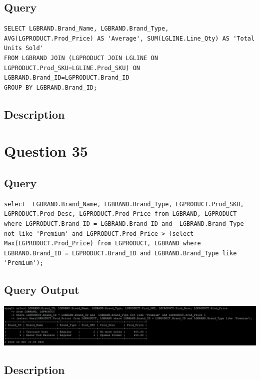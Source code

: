 \documentclass[a4paper,10pt]{article}
\begin{document}
 \subsection{Query}
          \lstset{
            language=SQL,
            breaklines=true
            }
        \begin{lstlisting}[frame=single]
        SELECT LGBRAND.Brand_Name, LGBRAND.Brand_Type, AVG(LGPRODUCT.Prod_Price) AS 'Average', SUM(LGLINE.Line_Qty) AS 'Total Units Sold'
FROM LGBRAND JOIN (LGPRODUCT JOIN LGLINE ON LGPRODUCT.Prod_SKU=LGLINE.Prod_SKU) ON LGBRAND.Brand_ID=LGPRODUCT.Brand_ID
GROUP BY LGBRAND.Brand_ID;

        \end{lstlisting}
\subsection{Description}
\section*{Question 35}
 \subsection{Query}
          \lstset{
            language=SQL,
            breaklines=true
            }
        \begin{lstlisting}[frame=single]
        select  LGBRAND.Brand_Name, LGBRAND.Brand_Type, LGPRODUCT.Prod_SKU, LGPRODUCT.Prod_Desc, LGPRODUCT.Prod_Price from LGBRAND, LGPRODUCT where LGPRODUCT.Brand_ID = LGBRAND.Brand_ID and  LGBRAND.Brand_Type not like 'Premium' and LGPRODUCT.Prod_Price > (select Max(LGPRODUCT.Prod_Price) from LGPRODUCT, LGBRAND where LGBRAND.Brand_ID = LGPRODUCT.Brand_ID and LGBRAND.Brand_Type like 'Premium');

        \end{lstlisting}
\subsection{Query Output}
           \includegraphics{Queries/Question_35/Question35.PNG}
\subsection{Description}
\end{document}
